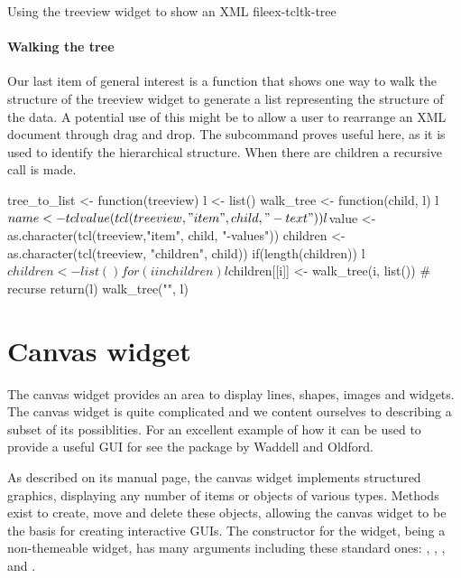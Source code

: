 \begin{example}{Using the treeview widget to show an XML file}{ex-tcltk-tree}
\paragraph{Walking the tree}
Our last item of general interest is a function that shows one way to
walk the structure of the treeview widget to generate a list
representing the structure of the data.  A potential use of this might
be to allow a user to rearrange an XML document through drag and drop.
The subcommand  proves useful here,
as it is used to identify the hierarchical structure. When there are children a recursive call is made.



\begin{Schunk}
\begin{Sinput}
 tree_to_list <- function(treeview) {
   l <- list()
   walk_tree <- function(child, l) {
     l$name <- tclvalue(tcl(treeview,"item", child, "-text"))
     l$value <- as.character(tcl(treeview,"item", child,
                                 "-values"))
     children <- as.character(tcl(treeview, "children", child)) 
     if(length(children)) {
       l$children <- list()
       for(i in children) 
         l$children[[i]] <- walk_tree(i, list()) # recurse
     }
     return(l)
   }
   walk_tree("", l)
 }
 
\end{Sinput}
\end{Schunk}
\end{example}

\section{Canvas widget}
\label{sec:tcltk:canvas-widget}

 
The canvas widget provides an area to display lines, shapes, images
and widgets. The canvas widget is quite complicated and we content
ourselves to describing a subset of its possiblities. For an excellent
example of how it can be used to provide a useful GUI for \R{} see the
 package by Waddell and Oldford.


As described on its manual page, the canvas widget implements
structured graphics, displaying any number of items or objects of
various types.  Methods exist to create, move and delete these
objects, allowing the canvas widget to be the basis for creating
interactive GUIs. The constructor  for the
widget, being a non-themeable widget, has many arguments including
these standard ones: ,
, ,
 and
.


